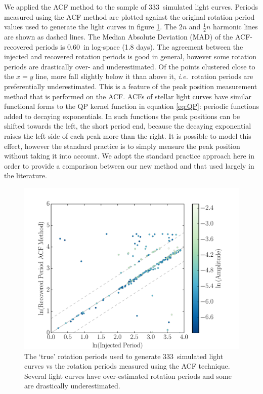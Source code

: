 \documentclass[useAMS, usenatbib, preprint, 12pt]{aastex}
\newcommand{\naigrain}{333}
\newcommand{\ie}{{\it i.e.}}
\newcommand{\acfRMS}{0.60}
\begin{document}
We applied the ACF method to the sample of \naigrain\ simulated light
curves.
Periods measured using the ACF method are plotted against the original
rotation period values used to generate the light curves in figure
\ref{fig:compare_acf}.
The $2n$ and $\frac{1}{2}n$ harmonic lines are shown as dashed lines.
The Median Absolute Deviation (MAD) of the ACF-recovered periods is \acfRMS\
in log-space (1.8 days).
The agreement between the injected and recovered rotation periods is good in
general, however some rotation periods are drastically over- and
underestimated.
Of the points clustered close to the $x=y$ line, more fall slightly below it
than above it, \ie\ rotation periods are preferentially underestimated.
This is a feature of the peak position measurement method that is performed on
the ACF.
ACFs of stellar light curves have similar functional forms to the QP kernel
function in equation \ref{eq:QP}: periodic functions added to decaying
exponentials.
In such functions the peak positions can be shifted towards the left, the
short period end, because the decaying exponential raises the left side of
each peak more than the right.
It is possible to model this effect, however the standard practice is to
simply measure the peak position without taking it into account.
We adopt the standard practice approach here in order to provide a comparison
between our new method and that used largely in the literature.

\begin{figure}
\begin{center}
\includegraphics[width=6in, clip=true]{figures/compare_acf.pdf}
\caption[ACF results.]
{The `true' rotation periods used to generate \naigrain\ simulated light
curves vs the rotation periods measured using the ACF technique.
    Several light curves have over-estimated rotation periods and some
    are drastically underestimated.}
\label{fig:compare_acf}
\end{center}
\end{figure}
\end{document}
